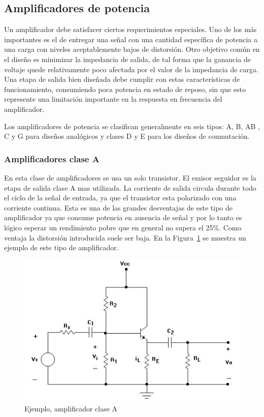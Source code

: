 	
\subsection{Amplificadores de potencia}
	
Un amplificador debe satisfacer ciertos requerimientos especiales. Uno de los más importantes es el de entregar una señal con una cantidad específica de potencia a una carga con niveles aceptablemente bajos de distorsión. Otro objetivo común en el diseño es minimizar la impedancia de salida, de tal forma que la ganancia de voltaje quede relativamente poco afectada por el valor de la impedancia de carga. Una etapa de salida bien diseñada debe cumplir con estas características de funcionamiento, consumiendo poca potencia en estado de reposo, sin que esto represente una limitación importante en la respuesta en frecuencia del amplificador. 
 
Los amplificadores de potencia  se clasifican generalmente en seis tipos: A, B, AB , C y G para diseños analógicos y clases D y E para los diseños de conmutación. 
\medskip 


\subsubsection{Amplificadores clase A}


En esta clase de amplificadores se usa un solo transistor. El emisor seguidor es la etapa de salida clase A mas utilizada. La corriente de salida circula durante todo el ciclo de la señal de entrada, ya que el transistor esta polarizado con una corriente continua. Esta es una de las grandes desventajas de este tipo de amplificador ya que consume potencia en ausencia de señal y por lo tanto es lógico esperar un rendimiento pobre que en general no supera el 25\%. Como ventaja la distorsión introducida suele ser baja. En la Figura~\ref{ampliA} se muestra un ejemplo de este tipo de amplificador.
 
\begin{figure}[H]
\centering
\includegraphics[scale=0.6]{img/ampliA.png}
\caption{Ejemplo, amplificador clase A}
\label{ampliA} 
\end{figure}

